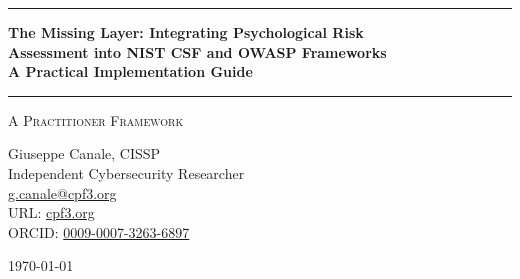 \documentclass[11pt,a4paper]{article}
\begin{document}
\thispagestyle{empty}
\begin{center}

\vspace*{0.5cm}

\rule{\textwidth}{1.5pt}

\vspace{0.5cm}

{\LARGE \textbf{The Missing Layer: Integrating Psychological Risk}}\\[0.3cm]
{\LARGE \textbf{Assessment into NIST CSF and OWASP Frameworks}}\\[0.3cm]
{\LARGE \textbf{A Practical Implementation Guide}}

\vspace{0.5cm}

\rule{\textwidth}{1.5pt}

\vspace{0.3cm}

{\large \textsc{A Practitioner Framework}}

\vspace{0.5cm}

{\Large Giuseppe Canale, CISSP}\\[0.2cm]
Independent Cybersecurity Researcher\\[0.1cm]
\href{mailto:g.canale@cpf3.org}{g.canale@cpf3.org}\\[0.1cm]
URL: \href{https://cpf3.org}{cpf3.org}\\[0.1cm]
ORCID: \href{https://orcid.org/0009-0007-3263-6897}{0009-0007-3263-6897}

\vspace{0.8cm}

{\large \today}

\vspace{1cm}

\end{center}
\end{document}
